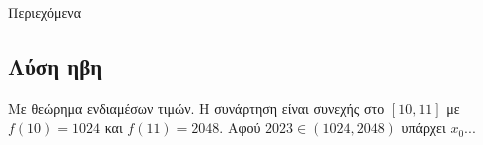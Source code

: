 \documentclass{presentation}
\begin{document}
\begin{frame}{Περιεχόμενα }
  \tableofcontents
\end{frame}

\subsection{Λύση ηβη}
\begin{lisi}
  Με θεώρημα ενδιαμέσων τιμών. Η συνάρτηση είναι συνεχής στο $[10,11]$ με $f(10)=1024$ και $f(11)=2048$. Αφού $2023\in (1024,2048)$ υπάρχει $x_0$...

  \hyperlink{Άσκηση1}{}
\end{lisi}

\end{document}
